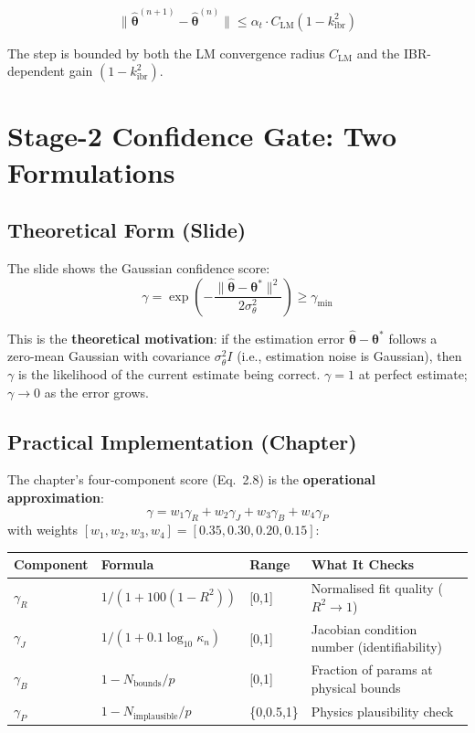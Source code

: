 \documentclass[12pt,a4paper]{article}
\newcommand{\kibr}{k_\mathrm{ibr}}
\newcommand{\thetahat}{\hat{\bm{\theta}}}
\newcommand{\thetastar}{\bm{\theta}^*}
\newcommand{\gmin}{\gamma_\mathrm{min}}
\newcommand{\sigth}{\sigma_\theta}
\begin{document}
\begin{equation}
  \|\thetahat^{(n+1)} - \thetahat^{(n)}\| \leq \alpha_t \cdot C_\mathrm{LM}(1-\kibr^2)
  \label{eq:update_bound}
\end{equation}

The step is bounded by both the LM convergence radius $C_\mathrm{LM}$ and the
IBR-dependent gain $(1-\kibr^2)$.

\section{Stage-2 Confidence Gate: Two Formulations}

\subsection{Theoretical Form (Slide)}

The slide shows the Gaussian confidence score:
\begin{equation}
  \gamma = \exp\!\left(-\frac{\|\thetahat - \thetastar\|^2}{2\sigth^2}\right) \geq \gmin
  \label{eq:gamma_gaussian}
\end{equation}

This is the \textbf{theoretical motivation}: if the estimation error
$\thetahat - \thetastar$ follows a zero-mean Gaussian with covariance
$\sigth^2 I$ (i.e., estimation noise is Gaussian), then $\gamma$ is the
likelihood of the current estimate being correct.  $\gamma = 1$ at perfect
estimate; $\gamma \to 0$ as the error grows.

\subsection{Practical Implementation (Chapter)}

The chapter's four-component score (Eq.~2.8) is the \textbf{operational
approximation}:
\begin{equation}
  \gamma = w_1 \gamma_R + w_2 \gamma_J + w_3 \gamma_B + w_4 \gamma_P
  \label{eq:gamma_weighted}
\end{equation}
with weights $[w_1, w_2, w_3, w_4] = [0.35, 0.30, 0.20, 0.15]$:

\begin{center}
\small
\begin{tabular}{@{}lllp{5cm}@{}}
\toprule
\textbf{Component} & \textbf{Formula} & \textbf{Range} & \textbf{What It Checks} \\
\midrule
$\gamma_R$ & $1/(1+100(1-R^2))$ & [0,1] & Normalised fit quality ($R^2 \to 1$) \\
$\gamma_J$ & $1/(1+0.1\log_{10}\kappa_n)$ & [0,1] & Jacobian condition number
                                                      (identifiability) \\
$\gamma_B$ & $1 - N_\mathrm{bounds}/p$ & [0,1] & Fraction of params at physical bounds \\
$\gamma_P$ & $1 - N_\mathrm{implausible}/p$ & \{0,0.5,1\} & Physics plausibility check \\
\bottomrule
\end{tabular}
\end{center}
\end{document}
